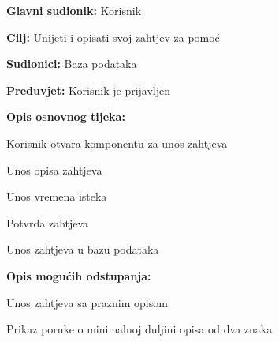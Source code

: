 			\noindent {}
			\begin{packed_item}
				
				\item \textbf{Glavni sudionik: }Korisnik
				\item  \textbf{Cilj:} Unijeti i opisati svoj zahtjev za pomoć
				\item  \textbf{Sudionici:} Baza podataka
				\item  \textbf{Preduvjet:} Korisnik je prijavljen
				\item  \textbf{Opis osnovnog tijeka:}
				
				\item[] \begin{packed_enum}
					
					\item Korisnik otvara komponentu za unos zahtjeva
					\item Unos opisa zahtjeva
					\item Unos vremena isteka
					\item Potvrda zahtjeva
					\item Unos zahtjeva u bazu podataka
				\end{packed_enum}
				
				\item  \textbf{Opis mogućih odstupanja:}
				
				\item[] \begin{packed_item}
					
					\item[2.a] Unos zahtjeva sa praznim opisom
					\item[] \begin{packed_enum}
						
						\item Prikaz poruke o minimalnoj duljini opisa od dva znaka
						
					\end{packed_enum}
					
				\end{packed_item}
			\end{packed_item}
		
